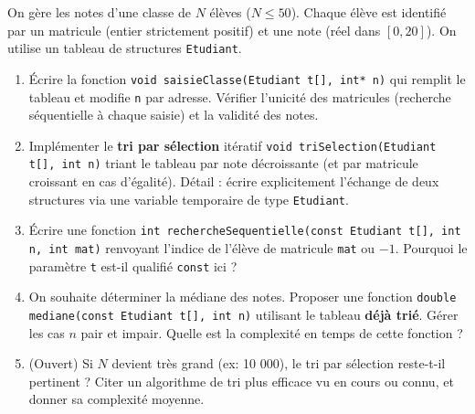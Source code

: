 \documentclass[11pt]{article}
\begin{document}
\begin{exercice}
On gère les notes d'une classe de $N$ élèves ($N \le 50$). Chaque élève est identifié par un matricule (entier strictement positif) et une note (réel dans $[0, 20]$). On utilise un tableau de structures \texttt{Etudiant}.
\begin{enumerate}
    \item Écrire la fonction \texttt{void saisieClasse(Etudiant t[], int* n)} qui remplit le tableau et modifie \texttt{n} par adresse. Vérifier l'unicité des matricules (recherche séquentielle à chaque saisie) et la validité des notes.
    \item Implémenter le \textbf{tri par sélection} itératif \texttt{void triSelection(Etudiant t[], int n)} triant le tableau par note décroissante (et par matricule croissant en cas d'égalité). Détail : écrire explicitement l'échange de deux structures via une variable temporaire de type \texttt{Etudiant}.
    \item Écrire une fonction \texttt{int rechercheSequentielle(const Etudiant t[], int n, int mat)} renvoyant l'indice de l'élève de matricule \texttt{mat} ou $-1$. Pourquoi le paramètre \texttt{t} est-il qualifié \texttt{const} ici ?
    \item On souhaite déterminer la médiane des notes. Proposer une fonction \texttt{double mediane(const Etudiant t[], int n)} utilisant le tableau \textbf{déjà trié}. Gérer les cas $n$ pair et impair. Quelle est la complexité en temps de cette fonction ?
    \item (Ouvert) Si $N$ devient très grand (ex: 10 000), le tri par sélection reste-t-il pertinent ? Citer un algorithme de tri plus efficace vu en cours ou connu, et donner sa complexité moyenne.
\end{enumerate}
\end{exercice}
\end{document}
